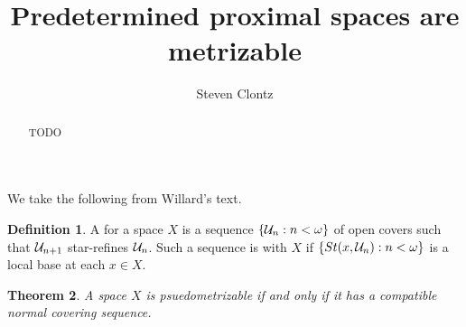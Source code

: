 \documentclass{amsart}
\newtheorem{theorem}{Theorem}[section]
\theoremstyle{definition}
\newtheorem{definition}[theorem]{Definition}
\begin{document}
\title{Predetermined proximal spaces are metrizable}




\author{Steven Clontz}
\address{Department of Mathematics and Statistics, University of South Alabama,
Mobile, AL 36688}




\begin{abstract}
TODO
\end{abstract}


\maketitle

We take the following from Willard's text.

\begin{definition}
A  for a space \(X\) is a sequence
\(\left\{\mathcal{U}_n:n<\omega\right\}\) of open covers such that
\(\mathcal{U}_{n+1}\) star-refines \(\mathcal{U}_n\). Such a sequence is
 with \(X\) if \(\left\{St(x,\mathcal{U}_n):n<\omega\right\}\)
is a local base at each \(x\in X\).
\end{definition}
\begin{theorem}
A space \(X\) is psuedometrizable if and only if it has a compatible
normal covering sequence.
\end{theorem}
\end{document}
